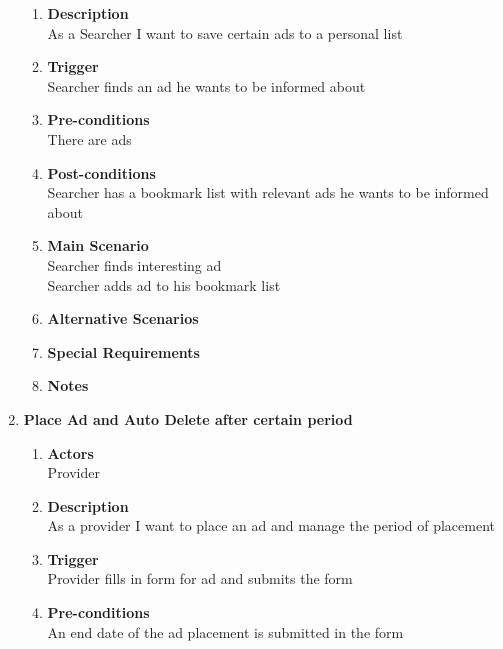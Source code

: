\documentclass{scrreprt}
\begin{document}
\begin{enumerate}
\begin{enumerate}
		\item \textbf{Description} \\
			As a Searcher I want to save certain ads to a personal list\\
			
		\item \textbf{Trigger} \\
			Searcher finds an ad he wants to be informed about\\

		\item \textbf{Pre-conditions} \\
			There are ads

		\item \textbf{Post-conditions} \\
			Searcher has a bookmark list with relevant ads he wants to be informed about\\

		\item \textbf{Main Scenario} \\
			Searcher finds interesting ad\\
			Searcher adds ad to his bookmark list\\

		\item \textbf{Alternative Scenarios} \\

		\item \textbf{Special Requirements} \\

		\item \textbf{Notes} \\
	\end{enumerate}


	\item \textbf{Place Ad and Auto Delete after certain period}
	\begin{enumerate}
		\item \textbf{Actors}  \\
			Provider

		\item \textbf{Description} \\
			As a provider I want to place an ad and manage the period of placement
			
		\item \textbf{Trigger} \\
			Provider fills in form for ad and submits the form

		\item \textbf{Pre-conditions} \\
			An end date of the ad placement is submitted in the form


\end{enumerate}
\end{enumerate}
\end{document}
